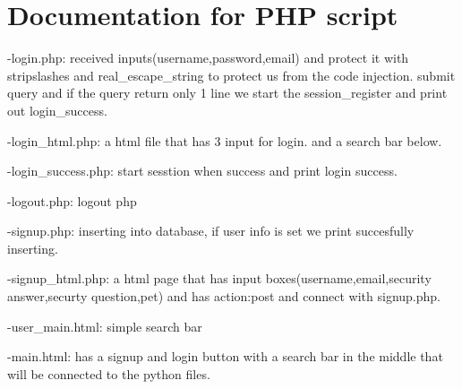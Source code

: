 \section{Documentation for PHP script}

-login.php: received inputs(username,password,email) and protect it with stripslashes and real\_escape\_string to protect us from the code injection. submit query and if the query return only 1 line we start the session\_register and print out login\_success.

-login\_html.php: a html file that has 3 input for login. and a search bar below.

-login\_success.php: start sesstion when success and print login success.

-logout.php: logout php

-signup.php: inserting into database, if user info is set we print succesfully inserting.

-signup\_html.php: a html page that has input boxes(username,email,security answer,securty question,pet) and has action:post and connect with signup.php.

-user\_main.html: simple search bar

-main.html: has a signup and login button with a search bar in the middle that will be connected to the python files.
